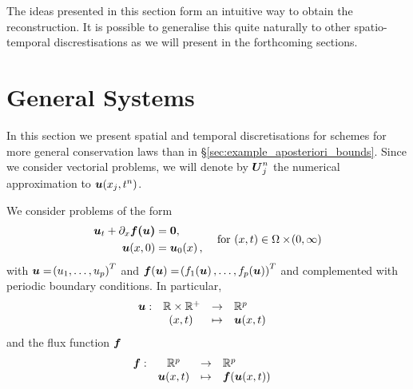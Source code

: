 \documentclass[final]{amsart}
\renewcommand{\dfunkmapsto}[5]{\ensuremath{
		\begin{array}{rccl}
			{#1}: & {#2} &\to&{#3}
			\\
			& {#4} &\mapsto&{#5}
		\end{array}\quad}}
\renewcommand{\vect}[1]{\geovec{#1}}
\renewcommand{\vec}[1]{\geovec{#1}}
\numberwithin{equation}{section}
\begin{document}
The ideas presented in this section form an intuitive way to obtain
the reconstruction. It is possible to generalise this quite naturally
to other spatio-temporal discrestisations as we will present in the
forthcoming sections.

\section{General Systems}\label{sec:numerical_discretisation}



In this section we present spatial and temporal discretisations for schemes for more general conservation laws than in \S\ref{sec:example_aposteriori_bounds}.  Since we consider vectorial problems, we will denote by $\vec{U}^n_j$ the numerical approximation to $\vec u\qp{x_j, t^n}$.  
\begin{Rem} We consider problems of the form
	\begin{equation}\label{eq_1d_gen_cons_law}
	\begin{aligned}
	\vect{u}_t+\partial_x\vect{f\qp{\vect{u}}}&=\vect{0},\\
	\vect{u}\qp{x,0}&=\vect{u}_0\qp{x},
	\end{aligned}\quad \text{ for } \qp{x,t}\in \W\times\qp{0,\infty}
	\end{equation}
	with $\vect{u}=\qp{u_1,\dots,u_p}^T$ and $\vect{f}\qp{\vect{u}}=\qp{f_1\qp{\vect{u}},\dots,f_p\qp{\vect{u}}}^T$ and complemented with periodic boundary conditions.
	In particular,
	\begin{equation}
	\dfunkmapsto{\vec{u}}{\mathbb{R}\times\mathbb{R}^+}{\mathbb{R}^p}{\qp{x,t}}{\vect{u}\qp{x,t}}
	\end{equation}
	and the flux function $\vect{f}$
	\begin{equation}
	\dfunkmapsto{\vec{f}}{\mathbb{R}^p}{\mathbb{R}^p}{\vect{u}\qp{x,t}}{\vect{f}\qp{\vect{u}\qp{x,t}}}
	\end{equation}
\end{Rem}
\end{document}
